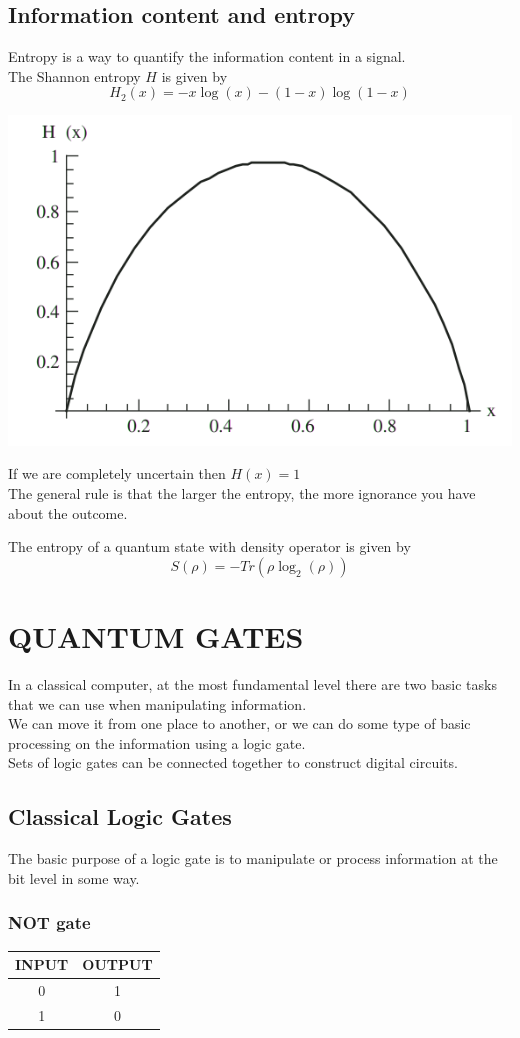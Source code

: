 \documentclass[12pt,oneside]{book}
\begin{document}
\section{Information content and entropy}
    Entropy is a way to quantify the information content in a signal.\\
    The Shannon entropy $H$ is given by 
    \[ H_2(x) = -x\log(x) - (1-x)\log(1-x) \]
    \begin{center}
        \includegraphics[width=0.5\linewidth]{../pic/3327/2.png}
    \end{center}
    If we are completely uncertain then $H(x) = 1$\\
    The general rule is that the larger the entropy, the more ignorance you have about the outcome.

    The entropy of a quantum state with density operator is given by 
    \[ S(\rho) = -Tr(\rho\log_2(\rho)) \]
    
\chapter{QUANTUM GATES}
In a classical computer, at the most fundamental level there are two basic tasks that we can use when manipulating information.\\
We can move it from one place to another, or we can do some type of basic processing on the information using a logic gate.\\
Sets of logic gates can be connected together to construct digital circuits.
\section{Classical Logic Gates}
The basic purpose of a logic gate is to manipulate or process information at the bit level in some way.
\subsection{NOT gate}	
    \begin{center}
        \begin{tabular}{|c|c|}
            \hline
             INPUT & OUTPUT \\ \hline
             0&1 \\ \hline
             1&0 \\ \hline
            \end{tabular}
    \end{center}
\end{document}
